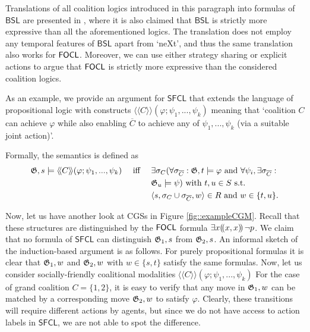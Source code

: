 \documentclass[sigconf,anonymous]{aamas}
\begin{document}
Translations of all coalition logics introduced in this paragraph into formulas of $\mathsf{BSL}$ are presented in \cite{goranko23}, where it is also claimed that $\mathsf{BSL}$ is strictly more expressive than all the aforementioned logics. The translation does not employ any temporal features of $\mathsf{BSL}$ apart from `ne\textsf{X}t', and thus the same translation also works for $\mathsf{FOCL}$. Moreover, we can use either strategy sharing or explicit actions to argue that $\mathsf{FOCL}$ is strictly more expressive than the considered coalition logics.

As an example,
we provide an argument for $\mathsf{SFCL}$ that extends the language of propositional logic with constructs $\langle \! \langle  C \rangle \! \rangle (\varphi;\psi_1,...,\psi_k)$ meaning that `coalition $C$ can achieve $\varphi$ while also enabling $\overline{C}$ to achieve any of $\psi_1,...,\psi_k$ (via a suitable joint action)'. 

Formally, the semantics is defined as 
  \begin{alignat*}{3}
        &\mathfrak{G},s \models \langle \! \langle C \rangle \! \rangle (\varphi; \psi_1, ..., \psi_k) && \text{ iff } && \exists \sigma_C (\forall \sigma_{\overline{C}} : \mathfrak{G},t \models \varphi \text{ and } \forall \psi_i, \exists  \sigma_{\overline{C}}:\\
         & && &&\mathfrak{G}_u \models \psi) \text{ with } t,u \in S \text{ s.t. }\\
        & && &&\langle s, \sigma_C \cup \sigma_{\overline{C}}, w \rangle \in R \text{ and } w \in \{t,u\}.   
\end{alignat*}   

Now, let us have another look at CGSs in Figure \ref{fig::exampleCGM}. Recall that these structures are distinguished by the $\mathsf{FOCL}$ formula $\exists x (\!( x,x )\!)\, \lnot p$. We claim that no formula of $\mathsf{SFCL}$ can distinguish $\mathfrak{G}_1,s$ from $\mathfrak{G}_2,s$. An informal sketch of the induction-based argument is as follows. For purely propositional formulas it is clear that $\mathfrak{G}_1,w$ and $\mathfrak{G}_2,w$ with $w\in \{s,t\}$ satisfy the same formulas. Now, let us consider socially-friendly coalitional modalities $\langle \! \langle  C \rangle \! \rangle (\varphi;\psi_1,...,\psi_k)$ For the case of grand coalition $C = \{1,2\}$, it is easy to verify that any move in $\mathfrak{G}_1,w$ can be matched by a corresponding move $\mathfrak{G}_2,w$ to satisfy $\varphi$. Clearly, these transitions will require different actions by agents, but since we do not have access to action labels in $\mathsf{SFCL}$, we are not able to spot the difference. 
\end{document}
